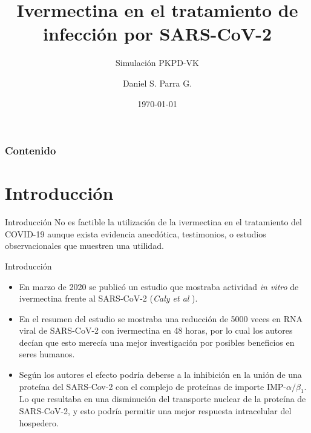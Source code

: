 \documentclass[12pt,xcolor=dvipsnames]{beamer}
\begin{document}
	\author[Daniel Parra]{Daniel S. Parra G.}
	\title[IVM en el tratamiento de Covid-19]{Ivermectina en el tratamiento de infección por SARS-CoV-2}
	\subtitle{Simulación PKPD-VK}
	\date{\today}
	\begin{frame}[plain]
		\maketitle
	\end{frame}
	
	\begin{frame}\frametitle{Contenido}
		\tableofcontents
	\end{frame}
	
	\section{Introducción}
	\begin{frame}{Introducción}
		No es factible la utilización de la ivermectina en el tratamiento del COVID-19 aunque exista evidencia anecdótica, testimonios, o estudios observacionales que muestren una utilidad.
	\end{frame}
	
	\begin{frame}{Introducción}
		\begin{itemize}
			\small\setlength\itemsep{1.5em}
			\item En marzo de 2020 se publicó un estudio que mostraba actividad \textit{in vitro} de ivermectina frente al SARS-CoV-2 (\textit{Caly et al} \cite{Caly2020}). \\
			
			\item  En el resumen del estudio se mostraba una reducción de 5000 veces en RNA viral de SARS-CoV-2 con ivermectina en 48 horas, por lo cual los autores decían que esto merecía una mejor investigación por posibles beneficios en seres humanos. \\
			
			\item Según los autores el efecto podría deberse a la inhibición en la unión de una proteína del SARS-Cov-2 con el complejo de proteínas de importe $\mathrm{IMP}\text{-}\alpha/\beta_{1}$. Lo que resultaba en una disminución del transporte nuclear de la proteína de SARS-CoV-2, y esto podría permitir una mejor respuesta intracelular del hospedero. 
		\end{itemize}
	\end{frame}
\end{document}
